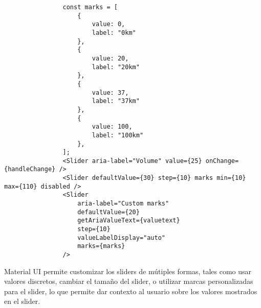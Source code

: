 \begin{itemize}
            \begin{lstlisting}
                const marks = [
                    {
                        value: 0,
                        label: "0km"
                    },
                    {
                        value: 20,
                        label: "20km"
                    },
                    {
                        value: 37,
                        label: "37km"
                    },
                    {
                        value: 100,
                        label: "100km"
                    },
                ];
                <Slider aria-label="Volume" value={25} onChange={handleChange} />
                <Slider defaultValue={30} step={10} marks min={10} max={110} disabled />
                <Slider
                    aria-label="Custom marks"
                    defaultValue={20}
                    getAriaValueText={valuetext}
                    step={10}
                    valueLabelDisplay="auto"
                    marks={marks}
                />
            \end{lstlisting}

          Material UI permite customizar los sliders de mútiples formas, tales como usar valores discretos, cambiar el tamaño del slider, o utilizar marcas personalizadas para el slider, lo que permite dar contexto al usuario sobre los valores mostrados en el slider.

\end{itemize}

